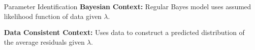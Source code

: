 \begin{block}{Parameter Identification}
\centering
            {\large \textbf{Bayesian Context:} Regular Bayes model uses assumed likelihood function of data given $\lambda$.}
            
            {\large \textbf{Data Consistent Context:} Uses data to construct a predicted distribution of the average residuals given $\lambda$.}
            



\end{block}

